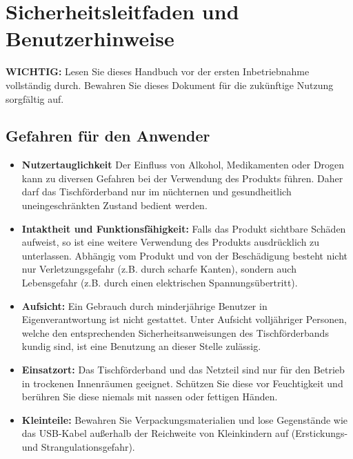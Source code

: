 %
%
%


\chapter{Sicherheitsleitfaden und Benutzerhinweise}
\textbf{WICHTIG:} Lesen Sie dieses Handbuch vor der ersten Inbetriebnahme vollständig durch. Bewahren Sie dieses Dokument für die zukünftige Nutzung sorgfältig auf.

\section{Gefahren für den Anwender}
\begin{itemize}
	\item \textbf {Nutzertauglichkeit}
	Der Einfluss von Alkohol, Medikamenten oder Drogen kann zu diversen Gefahren bei der Verwendung des Produkts führen. Daher darf das  Tischförderband nur im nüchternen und gesundheitlich uneingeschränkten Zustand bedient werden.
	\item \textbf {Intaktheit und Funktionsfähigkeit:} 
	Falls das Produkt sichtbare Schäden aufweist, so ist eine weitere Verwendung des Produkts ausdrücklich zu unterlassen. Abhängig vom Produkt und von der Beschädigung besteht nicht nur Verletzungsgefahr (z.B. durch scharfe Kanten), sondern auch Lebensgefahr (z.B. durch einen elektrischen Spannungsübertritt).
	\item \textbf {Aufsicht:}
	Ein Gebrauch durch minderjährige Benutzer in Eigenverantwortung ist nicht gestattet. Unter Aufsicht volljähriger Personen, welche den entsprechenden Sicherheitsanweisungen des Tischförderbands kundig sind, ist eine Benutzung an dieser Stelle zulässig.
	\item \textbf {Einsatzort:}
	Das Tischförderband und das Netzteil sind nur für den Betrieb in trockenen Innenräumen geeignet. Schützen Sie diese vor Feuchtigkeit und berühren Sie diese niemals mit nassen oder fettigen Händen.
	\item \textbf {Kleinteile:}
	Bewahren Sie Verpackungsmaterialien und lose Gegenstände wie das  USB-Kabel außerhalb der Reichweite von Kleinkindern auf (Erstickungs- und Strangulationsgefahr).
\end{itemize}

\bigskip

